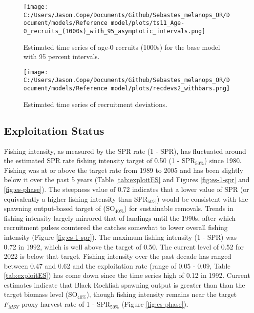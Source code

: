 \documentclass[11pt,
  english,
  letterpaper,
]{article}
\begin{document}


\begin{figure}
\centering
\texttt{[image: C:/Users/Jason.Cope/Documents/Github/Sebastes\_melanops\_OR/Document/models/Reference model/plots/ts11\_Age-0\_recruits\_(1000s)\_with\_95\_asymptotic\_intervals.png]}
\caption{Estimated time series of age-0 recruits (1000s) for the base model with 95 percent intervals.\label{fig:es-recruits}}
\end{figure}

\begin{figure}
\centering
\texttt{[image: C:/Users/Jason.Cope/Documents/Github/Sebastes\_melanops\_OR/Document/models/Reference model/plots/recdevs2\_withbars.png]}
\caption{Estimated time series of recruitment deviations.\label{fig:es-recdev}}
\end{figure}

\hypertarget{exploitation-status}{%
\subsection*{Exploitation Status}\label{exploitation-status}}

Fishing intensity, as measured by the SPR rate (1 - SPR), has fluctuated around the estimated SPR rate fishing intensity target of 0.50 (1 - \(\text{SPR}_{50\%}\)) since 1980. Fishing was at or above the target rate from 1989 to 2005 and has been slightly below it over the past 5 years (Table \ref{tab:exploitES} and Figures \ref{fig:es-1-spr} and \ref{fig:es-phase}). The steepness value of 0.72 indicates that a lower value of SPR (or equivalently a higher fishing intensity than \(\text{SPR}_{50\%}\)) would be consistent with the spawning output-based target of (\(\text{SO}_{40\%}\)) for sustainable removals. Trends in fishing intensity largely mirrored that of landings until the 1990s, after which recruitment pulses countered the catches somewhat to lower overall fishing intensity (Figure \ref{fig:es-1-spr}). The maximum fishing intensity (1 - SPR) was 0.72 in 1992, which is well above the target of 0.50. The current level of 0.52 for 2022 is below that target. Fishing intensity over the past decade has ranged between 0.47 and 0.62 and the exploitation rate (range of 0.05 - 0.09, Table \ref{tab:exploitES}) has come down since the time series high of 0.12 in 1992. Current estimates indicate that Black Rockfish spawning output is greater than than the target biomass level (\(\text{SO}_{40\%}\)), though fishing intensity remains near the target \(F_{MSY}\) proxy harvest rate of 1 - \(\text{SPR}_{50\%}\) (Figure \ref{fig:es-phase}).
\end{document}
